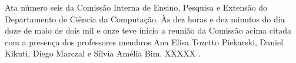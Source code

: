 \documentclass[11pt]{article}
\begin{document}
\header
{}

\noindent
\begin{linenumbers}

Ata número seis da Comissão Interna de Ensino, Pesquisa e Extensão do Departamento de Ciência da Computação. Às dez horas e dez minutos do dia doze de maio de dois mil e onze teve início a reunião da Comissão acima citada com a presença dos professores membros Ana Elisa Tozetto Piekarski, Daniel Kikuti, Diego Marczal e Sílvia Amélia Bim. XXXXX  .

\end{linenumbers}

\end{document}
